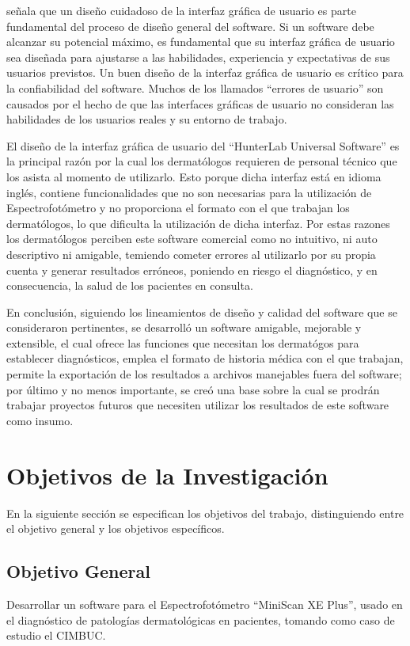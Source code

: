 \cite{Sommerville} se\~{n}ala que un dise\~{n}o cuidadoso de la interfaz gr\'{a}fica de usuario es parte fundamental del proceso de dise\~{n}o general del software. Si un software debe alcanzar su potencial m\'{a}ximo, es fundamental que su interfaz gr\'{a}fica de usuario sea dise\~{n}ada para ajustarse a las habilidades, experiencia y expectativas de sus usuarios previstos. Un buen dise\~{n}o de la interfaz gr\'{a}fica de usuario es cr\'{i}tico para la confiabilidad del software. Muchos de los llamados ``errores de usuario'' son causados por el hecho de que las interfaces gr\'{a}ficas de usuario no consideran las habilidades de los usuarios reales y su entorno de trabajo.

El dise\~{n}o de la interfaz gr\'{a}fica de usuario del ``HunterLab Universal Software'' es la principal raz\'{o}n por la cual los dermat\'{o}logos requieren de personal t\'{e}cnico que los asista al momento de utilizarlo. Esto porque dicha interfaz est\'{a} en idioma ingl\'{e}s, contiene funcionalidades que no son necesarias para la utilizaci\'{o}n de Espectrofot\'{o}metro y no proporciona el formato con el que trabajan los dermat\'{o}logos, lo que dificulta la utilizaci\'{o}n de dicha interfaz. Por estas razones los dermat\'{o}logos perciben este software comercial como no intuitivo, ni auto descriptivo ni amigable, temiendo cometer errores al utilizarlo por su propia cuenta y generar resultados err\'{o}neos, poniendo en riesgo el diagn\'{o}stico, y en consecuencia, la salud de los pacientes en consulta.

En conclusi\'{o}n, siguiendo los lineamientos de dise\~{n}o y calidad del software que se consideraron pertinentes, se desarroll\'{o} un software amigable, mejorable y extensible, el cual ofrece las funciones que necesitan los dermat\'{o}gos para establecer diagn\'{o}sticos, emplea el formato de historia m\'{e}dica con el que trabajan, permite la exportaci\'{o}n de los resultados a archivos manejables fuera del software; por \'{u}ltimo y no menos importante, se cre\'{o} una base sobre la cual se prodr\'{a}n trabajar proyectos futuros que necesiten utilizar los resultados de este software como insumo.
	\newpage

	\section{Objetivos de la Investigaci\'{o}n}
En la siguiente secci\'{o}n se especifican los objetivos del trabajo, distinguiendo entre el objetivo general y los objetivos espec\'{i}ficos.
		\subsection{Objetivo General}
	Desarrollar un software para el Espectrofot\'{o}metro ``MiniScan XE Plus'', usado en el diagn\'{o}stico de patolog\'{i}as dermatol\'{o}gicas en pacientes, tomando como caso de estudio el CIMBUC.
